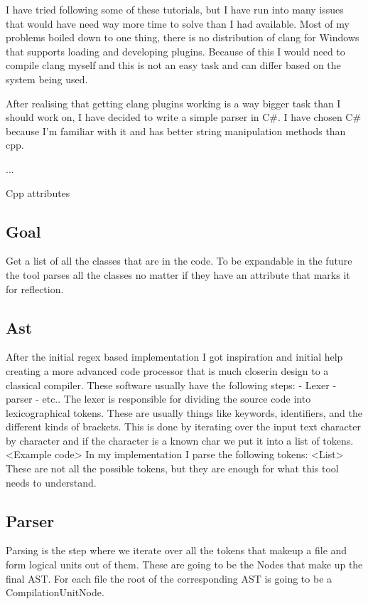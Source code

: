 I have tried following some of these tutorials, but I have run into many issues that would have need way more time to solve than I had available.
Most of my problems boiled down to one thing, there is no distribution of clang for Windows that supports loading and developing plugins.
Because of this I would need to compile clang myself and this is not an easy task and can differ based on the system being used.

After realising that getting clang plugins working is a way bigger task than I should work on, I have decided to write a simple parser in C\#.
I have chosen C\# because I'm familiar with it and has better string manipulation methods than cpp.

...

Cpp attributes

\subsection{Goal}
Get a list of all the classes that are in the code.
To be expandable in the future the tool parses all the classes no matter if they have an attribute that marks it for reflection.

\subsection{Ast}
After the initial regex based implementation I got inspiration and initial help creating a more advanced code processor that is much closerin design to a classical compiler. These software usually have the following steps:
- Lexer
- parser
- etc..
The lexer is responsible for dividing the source code into lexicographical tokens.
These are usually things like keywords, identifiers, and the different kinds of brackets.
This is done by iterating over the input text character by character and if the character is a known char we put it into a list of tokens.
<Example code>
In my implementation I parse the following tokens:
<List>
These are not all the possible tokens, but they are enough for what this tool needs to understand.

\subsection{Parser}
Parsing is the step where we iterate over all the tokens that makeup a file and form logical units out of them.
These are going to be the Nodes that make up the final AST. For each file the root of the corresponding AST is going to be a CompilationUnitNode.

